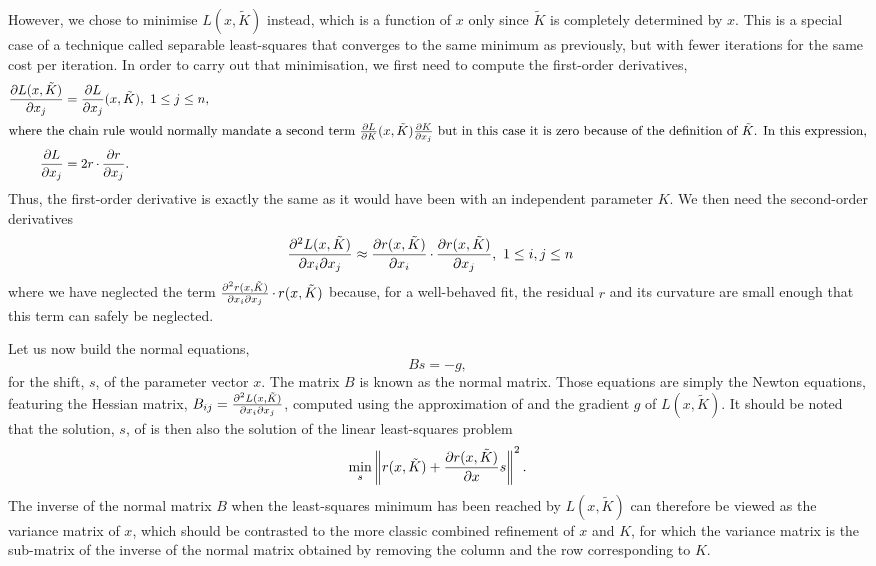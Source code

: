 \documentclass[pdf]{iucr}
\begin{document}
However, we chose to minimise $L(x, \tilde{K})$ instead, which is a function of $x$ only since $\tilde{K}$ is completely determined by $x$. This is a special case of a technique called separable least-squares \cite[and references therein]{Nielsen:2000fr} that  converges to the same minimum as previously, but with fewer iterations for the same cost per iteration. In order to carry out that minimisation, we first need to compute the first-order derivatives,
\begin{align}
\frac{\partial L(x, \tilde{K})}{\partial x_j} &= \frac{\partial L}{\partial x_j}(x, \tilde{K}),\ 1 \le j \le n, \\
\shortintertext{where the chain rule would normally mandate a second term $\frac{\partial L}{\partial K}(x, \tilde{K})\frac{\partial K}{\partial x_j}$ but in this case it is zero because of the definition of $\tilde{K}$. In this expression,}
\frac{\partial L}{\partial x_j} &= 2 r \operatorname{\cdot} \frac{\partial r}{\partial x_j}.
\end{align}
Thus, the first-order derivative is exactly the same as it would have been with an independent parameter $K$. We then need the second-order derivatives
\begin{align}
\frac{\partial^2 L(x, \tilde{K})}{\partial x_i \partial x_j} &\approx \frac{\partial r(x, \tilde{K})}{\partial x_i} \operatorname{\cdot} \frac{\partial r(x, \tilde{K})}{\partial x_j},\ 1 \le i,j \le n
\label{eqn:gaussleastsquares}
\end{align}
where we have neglected the term $\frac{\partial^2 r(x, \tilde{K})}{\partial x_i \partial x_j} \operatorname{\cdot} r(x, \tilde{K})$ because, for a well-behaved fit, the residual $r$ and its curvature are small enough that this term can safely be neglected.

Let us now build the normal equations, 
\begin{equation}
\label{eqn:gaussnewtoneq}
Bs = -g,
\end{equation}
for the shift, $s$, of the parameter vector $x$. The matrix $B$ is known as the normal matrix. Those equations are simply the Newton equations, featuring the Hessian matrix, $B_{ij} = \frac{\partial^2 L(x, \tilde{K})}{\partial x_i \partial x_j}$, computed using the approximation of  and the gradient $g$ of $L(x, \tilde{K})$. It should be noted that the solution, $s$, of  is then also the solution of the linear least-squares problem
\begin{equation}
\label{eqn:gaussnewtonaslinearls}
\min_s \left\| r(x, \tilde{K}) + \frac{\partial r(x, \tilde{K})}{\partial x} s \right\|^2.
\end{equation}
The inverse of the normal matrix $B$ when the least-squares minimum has been reached by $L(x, \tilde{K})$ can therefore be viewed as the variance matrix of $x$, which should be contrasted to the more classic combined refinement of $x$ and $K$, for which the variance matrix is the sub-matrix of the inverse of the normal matrix obtained by removing the column and the row corresponding to $K$. 
\end{document}
